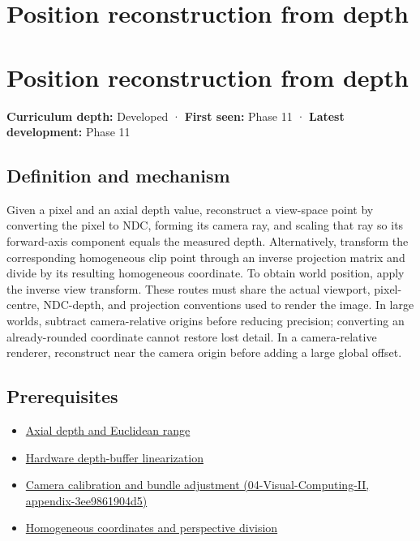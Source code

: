 \hypertarget{appendix-2cbf2968e866}{}
\section*{Position reconstruction from depth}
\section{Position reconstruction from depth}\label{appendix-2cbf2968e866-position-reconstruction-from-depth}

\textbf{Curriculum depth:} Developed · \textbf{First seen:} Phase 11 · \textbf{Latest development:} Phase 11

\subsection{Definition and mechanism}\label{appendix-2cbf2968e866-definition-and-mechanism}

Given a pixel and an axial depth value, reconstruct a view-space point by converting the pixel to NDC, forming its camera ray, and scaling that ray so its forward-axis component equals the measured depth. Alternatively, transform the corresponding homogeneous clip point through an inverse projection matrix and divide by its resulting homogeneous coordinate. To obtain world position, apply the inverse view transform. These routes must share the actual viewport, pixel-centre, NDC-depth, and projection conventions used to render the image. In large worlds, subtract camera-relative origins before reducing precision; converting an already-rounded coordinate cannot restore lost detail. In a camera-relative renderer, reconstruct near the camera origin before adding a large global offset.

\subsection{Prerequisites}\label{appendix-2cbf2968e866-prerequisites}

\begin{itemize}
\tightlist
\item
  \hyperref[appendix-cac01ebeeb11]{Axial depth and Euclidean range}
\item
  \hyperref[appendix-1bc40b08db4a]{Hardware depth-buffer linearization}
\item
  \href{../04-Visual-Computing-II/main.pdf\#nameddest=appendix-3ee9861904d5}{Camera calibration and bundle adjustment (04-Visual-Computing-II, appendix-3ee9861904d5)}
\item
  \hyperref[appendix-cb3b26862282]{Homogeneous coordinates and perspective division}
\end{itemize}

